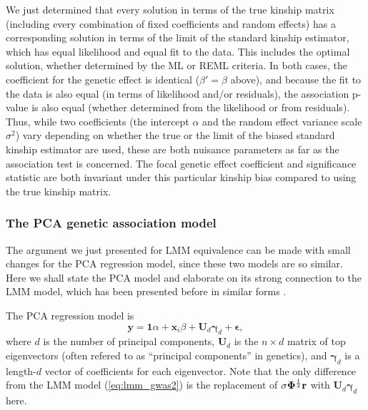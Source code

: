\documentclass[11pt]{article}
\newcommand{\kinMat}{%
  \ensuremath{%
    \mathbf{\Phi}
  }%
  \xspace%
}%
\begin{document}
We just determined that every solution in terms of the true kinship matrix (including every combination of fixed coefficients and random effects) has a corresponding solution in terms of the limit of the standard kinship estimator, which has equal likelihood and equal fit to the data.
This includes the optimal solution, whether determined by the ML or REML criteria.
In both cases, the coefficient for the genetic effect is identical ($\beta' = \beta$ above), and because the fit to the data is also equal (in terms of likelihood and/or residuals), the association p-value is also equal (whether determined from the likelihood or from residuals).
Thus, while two coefficients (the intercept $\alpha$ and the random effect variance scale $\sigma^2$) vary depending on whether the true or the limit of the biased standard kinship estimator are used, these are both nuisance parameters as far as the association test is concerned.
The focal genetic effect coefficient and significance statistic are both invariant under this particular kinship bias compared to using the true kinship matrix.

\subsubsection{The PCA genetic association model}

The argument we just presented for LMM equivalence can be made with small changes for the PCA regression model, since these two models are so similar.
Here we shall state the PCA model and elaborate on its strong connection to the LMM model, which has been presented before in similar forms \citep{astle_population_2009, hoffman_correcting_2013}.

The PCA regression model is
\begin{equation}
  \label{eq:pca_gwas}
  \mathbf{y}
  =
  \mathbf{1} \alpha + \mathbf{x}_i \beta + \mathbf{U}_d \boldsymbol{\gamma}_d + \boldsymbol{\epsilon}
  ,
\end{equation}
where
$d$ is the number of principal components,
$\mathbf{U}_d$ is the $n \times d$ matrix of top eigenvectors (often refered to as ``principal components'' in genetics),
and $\boldsymbol{\gamma}_d$ is a length-$d$ vector of coefficients for each eigenvector.
Note that the only difference from the LMM model (\cref{eq:lmm_gwas2}) is the replacement of $\sigma \kinMat^\frac{1}{2} \mathbf{r}$ with $\mathbf{U}_d \boldsymbol{\gamma}_d$ here.
\end{document}
